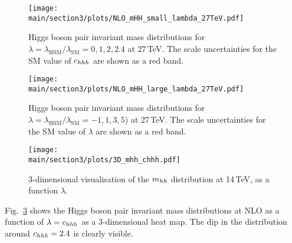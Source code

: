 \begin{figure}[htb]
  \centering
    \texttt{[image: \\main/section3/plots/NLO\_mHH\_small\_lambda\_27TeV.pdf]}
\caption{Higgs boson pair invariant mass distributions for $\lambda=\lambda_{\mathrm{BSM}}/\lambda_{\mathrm{SM}}=0,1,2,2.4$  at 27\,TeV. The scale uncertainties for the SM value of $c_{hhh}$ are shown as a red band.}
\label{fig:lambda_small_27}
\end{figure}

\begin{figure}[htb]
  \centering
    \texttt{[image: \\main/section3/plots/NLO\_mHH\_large\_lambda\_27TeV.pdf]}
\caption{Higgs boson pair invariant mass distributions for $\lambda=\lambda_{\mathrm{BSM}}/\lambda_{\mathrm{SM}}=-1,1,3,5$)  at 27\,TeV. The scale uncertainties for the SM value of $\lambda$ are shown as a red band.}
\label{fig:lambda_large_27}
\end{figure}

\begin{figure}[ht]
\begin{center}
  \texttt{[image: \\main/section3/plots/3D\_mhh\_chhh.pdf]}    
\end{center}
\caption{3-dimensional visualisation of the $m_{hh}$ distribution at
  14\,TeV, as a function  $\lambda$.}
\label{fig:chhh_3D}
\end{figure}
Fig.~\ref{fig:chhh_3D} shows the Higgs boson pair invariant mass
distributions at NLO as a function of $\lambda=c_{hhh}$  as a 3-dimensional heat map.
The dip in the distribution around $c_{hhh}=2.4$ is clearly visible.
 
%


